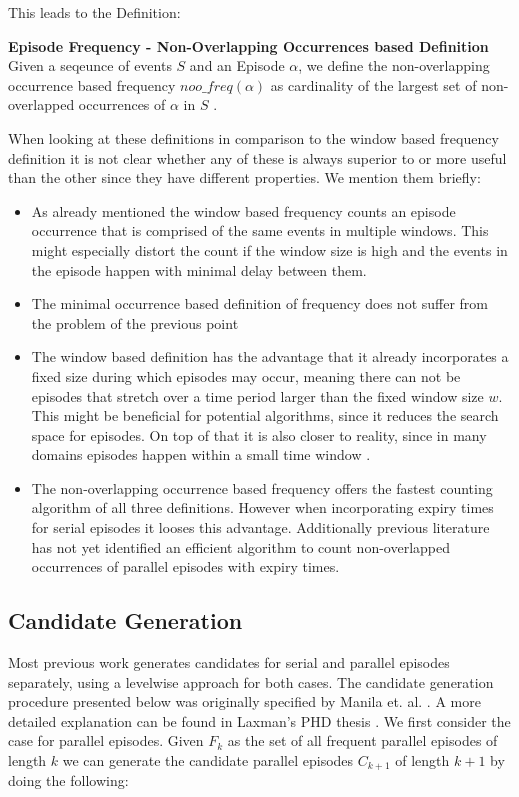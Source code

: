 This leads to the Definition:

\begin{mydef}
\label{def_nonOverlappingFrequency}
\textbf{Episode Frequency - Non-Overlapping Occurrences based Definition} Given a seqeunce of events $S$ and an Episode $\alpha$, we define the non-overlapping occurrence based frequency $noo\_freq(\alpha )$ as cardinality of the largest set of non-overlapped occurrences of $\alpha$ in $S$ \cite{laxman2007fast}.
\end{mydef}


When looking at these definitions in comparison to the window based frequency definition it is not clear whether any of these is always superior to or more useful than the other since they have different properties. We mention them briefly:

\begin{itemize}
	\item As already mentioned the window based frequency counts an episode occurrence that is comprised of the same events in multiple windows. This might especially distort the count if the window size is high and the events in the episode happen with minimal delay between them.
	\item The minimal occurrence based definition of frequency does not suffer from the problem of the previous point
	\item The window based definition has the advantage that it already incorporates a fixed size during which episodes may occur, meaning there can not be episodes that stretch over a time period larger than the fixed window size $w$. This might be beneficial for potential algorithms, since it reduces the search space for episodes. On top of that it is also closer to reality, since in many domains episodes happen within a small time window \cite{generatingEpisodeDatasets}.
	\item The non-overlapping occurrence based frequency offers the fastest counting algorithm of all three definitions. However when incorporating expiry times for serial episodes it looses this advantage. Additionally previous literature has not yet identified an efficient algorithm to count non-overlapped occurrences of parallel episodes with expiry times. 
\end{itemize}

\subsection{Candidate Generation}
\label{subsec_candidateGen}
Most previous work generates candidates for serial and parallel episodes separately, using a levelwise approach for both cases. The candidate generation procedure presented below was originally specified by Manila et. al. \cite{mannila1997discovery}. A more detailed explanation can be found in Laxman's PHD thesis \cite{laxman2006discovering}. \newline
We first consider the case for parallel episodes. Given $F_k$ as the set of all frequent parallel episodes of length $k$ we can generate the candidate parallel episodes $C_{k+1}$ of length $k+1$ by doing the following:

